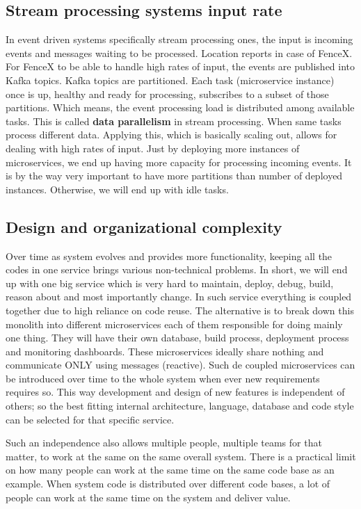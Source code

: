 \documentclass[a4]{report}
\begin{document}
    \subsection{Stream processing systems input rate}
    In event driven systems specifically stream processing ones, the input is incoming events and messages waiting to
    be processed.
    Location reports in case of FenceX.
    For FenceX to be able to handle high rates of input, the events are published into Kafka topics.
    Kafka topics are partitioned.
    Each task (microservice instance) once is up, healthy and ready for processing, subscribes to a subset of those
    partitions.
    Which means, the event processing load is distributed among available tasks.
    This is called \textbf{data parallelism} in stream processing.
    When same tasks process different data.
    Applying this, which is basically scaling out, allows for dealing with high rates of input.
    Just by deploying more instances of microservices, we end up having more capacity for processing incoming events.
    It is by the way very important to have more partitions than number of deployed instances.
    Otherwise, we will end up with idle tasks.

    \subsection{Design and organizational complexity}
    Over time as system evolves and provides more functionality, keeping all the codes in one service brings various
    non-technical problems.
    In short, we will end up with one big service which is very hard to maintain, deploy, debug, build, reason about
    and most importantly change.
    In such service everything is coupled together due to high reliance on code reuse.
    The alternative is to break down this monolith into different microservices each of them responsible for doing
    mainly one thing.
    They will have their own database, build process, deployment process and monitoring dashboards.
    These microservices ideally share nothing and communicate ONLY using messages (reactive).
    Such de coupled microservices can be introduced over time to the whole system when ever new requirements requires so.
    This way development and design of new features is independent of others;
    so the best fitting internal architecture, language, database and code style can be selected for that specific service.

    Such an independence also allows multiple people, multiple teams for that matter, to work at the same on the same
    overall system.
    There is a practical limit on how many people can work at the same time on the same code base as an example.
    When system code is distributed over different code bases, a lot of people can work at the same time on the
    system and deliver value.
\end{document}
